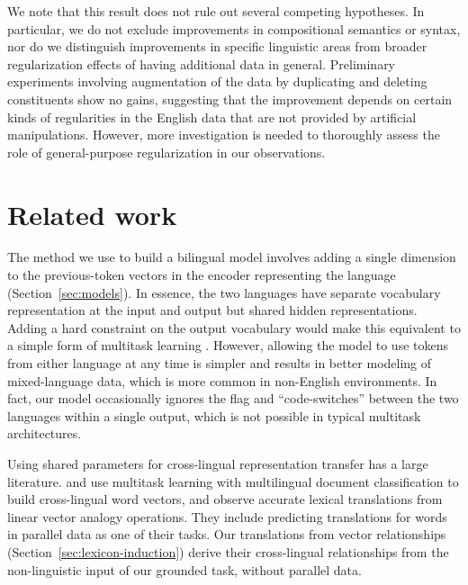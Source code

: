 \documentclass[11pt,a4paper]{article}
\renewcommand{\|}{\mid}
\newcommand{\secref}[1]{Section~\ref{#1}}
\begin{document}
We note that this result does not rule out several competing hypotheses. In particular,
we do not exclude improvements in compositional semantics or syntax, nor do we
distinguish improvements in specific linguistic areas from broader regularization
effects of having additional data in general. Preliminary experiments involving
augmentation of the data by duplicating and deleting constituents show no gains,
suggesting that the improvement depends on certain kinds of regularities in the English
data that are not provided by artificial manipulations. However, more investigation is
needed to thoroughly assess the role of general-purpose regularization in our
observations.

\section{Related work}

The method we use to build a bilingual model involves adding a single dimension to the previous-token vectors in the encoder representing the language (\secref{sec:models}). 
In essence, the two languages have separate vocabulary representation at the input and output but shared hidden representations. 
Adding a hard constraint on the output vocabulary
would make this equivalent to a simple form of multitask learning \citep{Caruana1997,Collobert2008}.
However, allowing the model to use tokens from either language at any time is simpler
and results in better modeling of mixed-language data, which is more common in
non-English environments. In fact, our model occasionally ignores the flag
and ``code-switches'' between the two languages within a single output, which is not possible in typical multitask architectures.

Using shared parameters for cross-lingual representation transfer has a large literature.
\citet{Klementiev2012} and \citet{Hermann2014} use multitask learning with multilingual document classification to build cross-lingual
word vectors, and observe accurate lexical translations from linear vector analogy operations. They include predicting translations for
words in parallel data as one of their tasks. Our translations from vector relationships (\secref{sec:lexicon-induction}) derive their cross-lingual
relationships from the non-linguistic input of our grounded task, without parallel data.
\end{document}
